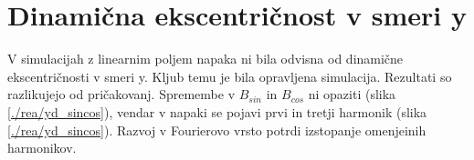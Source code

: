 \section{Dinamična ekscentričnost v smeri y}

V simulacijah z linearnim poljem napaka ni bila odvisna od dinamične ekscentričnosti v smeri y. Kljub temu je bila opravljena simulacija. Rezultati so razlikujejo od pričakovanj. Spremembe v $B_{sin}$ in $B_{cos}$ ni opaziti (slika \ref{./rea/yd_sincos}), vendar v napaki se pojavi prvi in tretji harmonik (slika \ref{./rea/yd_sincos}). Razvoj v Fourierovo vrsto potrdi izstopanje omenjeinih harmonikov.
\newpage
